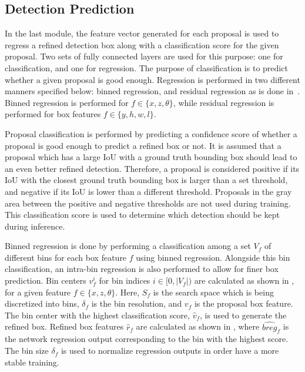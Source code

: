\documentclass[10pt,twocolumn,letterpaper]{article}
\begin{document}
\subsection{Detection Prediction}
In the last module, the feature vector generated for each proposal is used to regress a refined detection box along with a classification score for the given proposal.
Two sets of fully connected layers are used for this purpose: one for classification, and one for regression.
The purpose of classification is to predict whether a given proposal is good enough.
Regression is performed in two different manners specified below: binned regression, and residual regression as is done in~\cite{shi2019pointrcnn}.
Binned regression is performed for $f \in \{x,z,\theta\}$, while residual regression is performed for box features $f \in \{y,h,w,l\}$.

Proposal classification is performed by predicting a confidence score of whether a proposal is good enough to predict a refined box or not.
It is assumed that a proposal which has a large IoU with a ground truth bounding box should lead to an even better refined detection.
Therefore, a proposal is considered positive if its IoU with the closest ground truth bounding box is larger than a set threshold, and negative if its IoU is lower than a different threshold.
Proposals in the gray area between the positive and negative thresholds are not used during training.
This classification score is used to determine which detection should be kept during inference.


Binned regression is done by performing a classification among a set $V_f$ of different bins for each box feature $f$ using binned regression.
Alongside this bin classification, an intra-bin regression is also performed to allow for finer box prediction.
Bin centers $v^i_f$ for bin indices $i \in [0,\vert V_f \vert)$ are calculated as shown in , for a given feature $f \in \{x,z,\theta\}$.
Here, $S_f$ is the search space which is being discretized into bins, $\delta_f$ is the bin resolution, and $v_f$ is the proposal box feature.
The bin center with the highest classification score, $\hat{v}_f$, is used to generate the refined box.
Refined box features $\hat{r}_f$ are calculated as shown in , where $\widehat{breg}_f$ is the network regression output corresponding to the bin with the highest score.
The bin size $\delta_f$ is used to normalize regression outputs in order have a more stable training.
\end{document}
